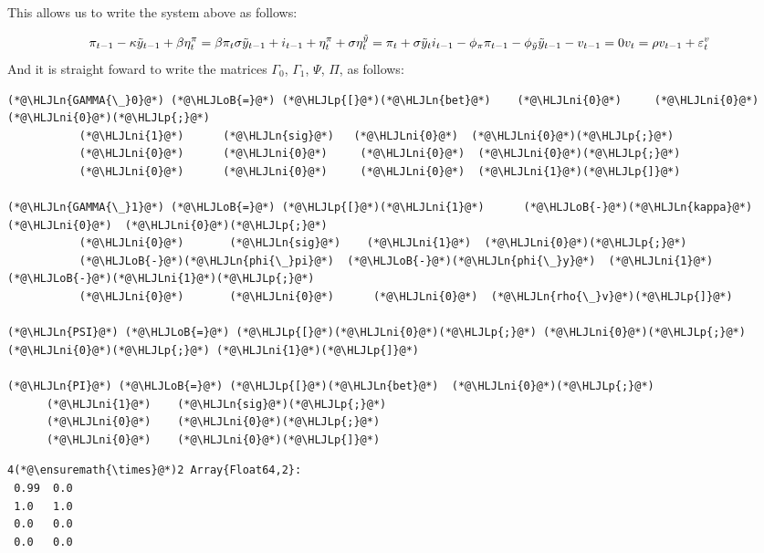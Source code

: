 \documentclass[12pt,a4paper]{article}
\newcommand{\HLJLn}[1]{#1}
\newcommand{\HLJLni}[1]{\textcolor[RGB]{59,151,46}{#1}}
\newcommand{\HLJLoB}[1]{\textcolor[RGB]{102,102,102}{\textbf{#1}}}
\newcommand{\HLJLp}[1]{#1}
\begin{document}
This allows us to write the system above as follows:

\[
\pi_{t-1} - \kappa \tilde{y}_{t-1} + \beta \eta_t^{\pi} = \beta \pi_t\\
\sigma\tilde{y}_{t-1} + i_{t-1} + \eta_t^{\pi} + \sigma \eta_t^{\tilde{y}} = \pi_t + \sigma \tilde{y}_t\\
i_{t-1} - \phi_{\pi}\pi_{t-1} - \phi_{\tilde{y}} \tilde{y}_{t-1} - v_{t-1} = 0\\
v_t = \rho v_{t-1} + \varepsilon^v_t
\]
And it is straight foward to write the matrices $\Gamma_0$, $\Gamma_1$, $\Psi$, $\Pi$, as follows:


\begin{lstlisting}
(*@\HLJLn{GAMMA{\_}0}@*) (*@\HLJLoB{=}@*) (*@\HLJLp{[}@*)(*@\HLJLn{bet}@*)    (*@\HLJLni{0}@*)     (*@\HLJLni{0}@*)  (*@\HLJLni{0}@*)(*@\HLJLp{;}@*)
           (*@\HLJLni{1}@*)      (*@\HLJLn{sig}@*)   (*@\HLJLni{0}@*)  (*@\HLJLni{0}@*)(*@\HLJLp{;}@*)
           (*@\HLJLni{0}@*)      (*@\HLJLni{0}@*)     (*@\HLJLni{0}@*)  (*@\HLJLni{0}@*)(*@\HLJLp{;}@*)
           (*@\HLJLni{0}@*)      (*@\HLJLni{0}@*)     (*@\HLJLni{0}@*)  (*@\HLJLni{1}@*)(*@\HLJLp{]}@*)

(*@\HLJLn{GAMMA{\_}1}@*) (*@\HLJLoB{=}@*) (*@\HLJLp{[}@*)(*@\HLJLni{1}@*)      (*@\HLJLoB{-}@*)(*@\HLJLn{kappa}@*)  (*@\HLJLni{0}@*)  (*@\HLJLni{0}@*)(*@\HLJLp{;}@*)
           (*@\HLJLni{0}@*)       (*@\HLJLn{sig}@*)    (*@\HLJLni{1}@*)  (*@\HLJLni{0}@*)(*@\HLJLp{;}@*)
           (*@\HLJLoB{-}@*)(*@\HLJLn{phi{\_}pi}@*)  (*@\HLJLoB{-}@*)(*@\HLJLn{phi{\_}y}@*)  (*@\HLJLni{1}@*) (*@\HLJLoB{-}@*)(*@\HLJLni{1}@*)(*@\HLJLp{;}@*)
           (*@\HLJLni{0}@*)       (*@\HLJLni{0}@*)      (*@\HLJLni{0}@*)  (*@\HLJLn{rho{\_}v}@*)(*@\HLJLp{]}@*)

(*@\HLJLn{PSI}@*) (*@\HLJLoB{=}@*) (*@\HLJLp{[}@*)(*@\HLJLni{0}@*)(*@\HLJLp{;}@*) (*@\HLJLni{0}@*)(*@\HLJLp{;}@*) (*@\HLJLni{0}@*)(*@\HLJLp{;}@*) (*@\HLJLni{1}@*)(*@\HLJLp{]}@*)

(*@\HLJLn{PI}@*) (*@\HLJLoB{=}@*) (*@\HLJLp{[}@*)(*@\HLJLn{bet}@*)  (*@\HLJLni{0}@*)(*@\HLJLp{;}@*)
      (*@\HLJLni{1}@*)    (*@\HLJLn{sig}@*)(*@\HLJLp{;}@*)
      (*@\HLJLni{0}@*)    (*@\HLJLni{0}@*)(*@\HLJLp{;}@*)
      (*@\HLJLni{0}@*)    (*@\HLJLni{0}@*)(*@\HLJLp{]}@*)
\end{lstlisting}

\begin{lstlisting}
4(*@\ensuremath{\times}@*)2 Array{Float64,2}:
 0.99  0.0
 1.0   1.0
 0.0   0.0
 0.0   0.0
\end{lstlisting}
\end{document}
